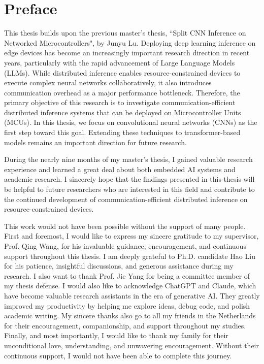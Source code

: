 \chapter*{Preface}


This thesis builds upon the previous master's thesis, ``Split CNN Inference on Networked Microcontrollers", by Junyu Lu. Deploying deep learning inference on edge devices has become an increasingly important research direction in recent years, particularly with the rapid advancement of Large Language Models (LLMs). While distributed inference enables resource-constrained devices to execute complex neural networks collaboratively, it also introduces communication overhead as a major performance bottleneck. Therefore, the primary objective of this research is to investigate communication-efficient distributed inference systems that can be deployed on Microcontroller Units (MCUs). In this thesis, we focus on convolutional neural networks (CNNs) as the first step toward this goal. Extending these techniques to transformer-based models remains an important direction for future research.

During the nearly nine months of my master's thesis, I gained valuable research experience and learned a great deal about both embedded AI systems and academic research. I sincerely hope that the findings presented in this thesis will be helpful to future researchers who are interested in this field and contribute to the continued development of communication-efficient distributed inference on resource-constrained devices. 

This work would not have been possible without the support of many people. First and foremost, I would like to express my sincere gratitude to my supervisor, Prof. Qing Wang, for his invaluable guidance, encouragement, and continuous support throughout this thesis. I am deeply grateful to Ph.D. candidate Hao Liu for his patience, insightful discussions, and generous assistance during my research. I also want to thank Prof. Jie Yang for being a committee member of my thesis defense. I would also like to acknowledge ChatGPT and Claude, which have become valuable research assistants in the era of generative AI. They greatly improved my productivity by helping me explore ideas, debug code, and polish academic writing. My sincere thanks also go to all my friends in the Netherlands for their encouragement, companionship, and support throughout my studies. Finally, and most importantly, I would like to thank my family for their unconditional love, understanding, and unwavering encouragement. Without their continuous support, I would not have been able to complete this journey. 

